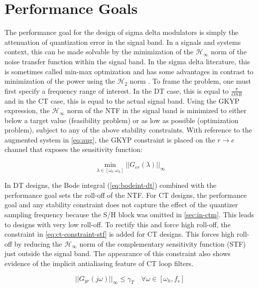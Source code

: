 \section{Performance Goals}
\label{sec:stab-perf}

The performance goal for the design of sigma delta modulators is simply the attenuation of quantization error in the signal band. In a signals and systems context, this can be made solvable by the minimization of the $\mathcal{H}_\infty$ norm of the noise transfer function within the signal band. In the sigma delta literature, this is sometimes called min-max optmization and has some advantages in contrast to minimization of the power using the $\mathcal{H}_2$ norm \cite{Nagahara2012}. To frame the problem, one must first specify a frequency range of interest. In the \gls{DT} case, this is equal to $\frac{\pi}{OSR}$ and in the \gls{CT} case, this is equal to the actual signal band. Using the \gls{GKYP} expression, the $\mathcal{H}_\infty$ norm of the \gls{NTF} in the signal band is minimized to either below a target value (feasibility problem) or as low as possible (optimization problem), subject to any of the above stability constraints. With reference to the augmented system in \autoref{eq:aug}, the \gls{GKYP} constraint is placed on the $r \rightarrow e$ channel that exposes the sensitivity function:

\begin{equation}
	\min_{\lambda \in [\omega_l, \omega_h]} ||G_{er}(\lambda)||_\infty \label{eq:perf}
\end{equation}

In \gls{DT} designs, the Bode integral (\ref{eq:bodeint-dt}) combined with the performance goal sets the roll-off of the \gls{NTF}. For \gls{CT} designs, the performance goal and any stability constraint does not capture the effect of the quantizer sampling frequency because the \gls{S/H} block was omitted in \autoref{sec:in-ctm}. This leads to designs with very low roll-off. To rectify this and force high roll-off, the constraint in \ref{eq:ct-constraint-stf} is added for \gls{CT} designs. This forces high roll-off by reducing the $\mathcal{H}_\infty$ norm of the complementary sensitivity function (\gls{STF}) just outside the signal band. The appearance of this constraint also shows evidence of the implicit antialiasing feature of \gls{CT} loop filters.

\begin{equation}
	||G_{yr}(j\omega)||_\infty \leq \gamma_{T} \quad \forall \omega \in [\omega_h, f_s] \label{eq:ct-constraint-stf}
\end{equation}